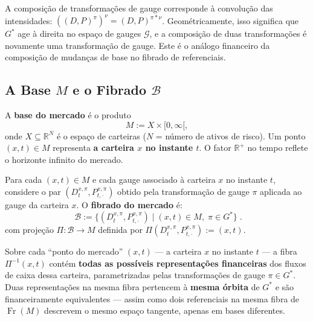 \begin{obs}
A composi\c{c}\~ao de transforma\c{c}\~oes de gauge corresponde \`a
convolu\c{c}\~ao das intensidades: $((D,P)^\pi)^\nu = (D,P)^{\pi * \nu}$.
Geom\'etricamente, isso significa que $G^*$ age \`a direita no espa\c{c}o
de gauges $\mathcal{G}$, e a composi\c{c}\~ao de duas transforma\c{c}\~oes
\'e novamente uma transforma\c{c}\~ao de gauge. Este \'e o an\'alogo
financeiro da composi\c{c}\~ao de mudan\c{c}as de base no fibrado de
referenciais.
\end{obs}

\subsection{A Base $M$ e o Fibrado $\mathcal{B}$}

\begin{defi}\label{def:base_M}
A \textbf{base do mercado} \'e o produto
\begin{equation}\label{eq:base}
 M := X \times [0, \infty[,
\end{equation}
onde $X \subseteq \mathbb{R}^N$ \'e o espa\c{c}o de carteiras
($N$ = n\'umero de ativos de risco). Um ponto $(x, t) \in M$ representa
\textbf{a carteira $x$ no instante $t$}. O fator $\mathbb{R}^+$ no tempo
reflete o horizonte infinito do mercado.
\end{defi}

\begin{defi}\label{def:fibrado_B}
Para cada $(x, t) \in M$ e cada gauge associado \`a carteira $x$ no
instante $t$, considere o par $(D_t^{x, \pi}, P_{t,\cdot}^{x,\pi})$
obtido pela transforma\c{c}\~ao de gauge $\pi$ aplicada ao gauge da
carteira $x$. O \textbf{fibrado do mercado} \'e:
\begin{equation}\label{eq:fibrado_mercado}
 \boxed{\;
 \mathcal{B} := \bigl\{(D_t^{x,\pi}, P_{t,\cdot}^{x,\pi}) \;\big|\;
 (x, t) \in M,\; \pi \in G^* \bigr\}\; }.
\end{equation}
com proje\c{c}\~ao $\Pi: \mathcal{B} \to M$ definida por
$\Pi(D_t^{x,\pi}, P_{t,\cdot}^{x,\pi}) := (x, t)$.
\end{defi}

\begin{obs}
Sobre cada ``ponto do mercado'' $(x, t)$ --- a carteira $x$ no instante $t$
--- a fibra $\Pi^{-1}(x,t)$ cont\'em \textbf{todas as poss\'iveis
representa\c{c}\~oes financeiras} dos fluxos de caixa dessa carteira,
parametrizadas pelas transforma\c{c}\~oes de gauge $\pi \in G^*$. Duas
representa\c{c}\~oes na mesma fibra pertencem \`a \textbf{mesma \'orbita} de
$G^*$ e s\~ao financeiramente equivalentes --- assim como dois referenciais
na mesma fibra de $\operatorname{Fr}(M)$ descrevem o mesmo espa\c{c}o tangente,
apenas em bases diferentes.
\end{obs}

